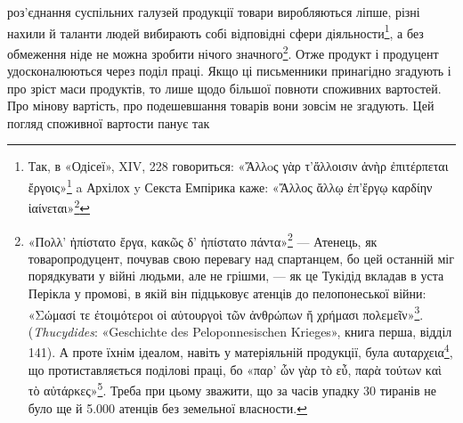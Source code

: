 роз’єднання суспільних галузей продукції товари виробляються
ліпше, різні нахили й таланти людей вибирають собі відповідні
сфери діяльности\footnote{
Так, в «Одісеї», XIV, 228 говориться: «\textgreek{Ἄλλoς γὰρ τ’ἄλλοισιν ἀνὴρ ἐπιτέρπεται ἔργοις}»\footnote*{
Одні люди люблять одне, інші — інше. \emph{Ред.}
} a Архілох y Секста Емпірика каже: «\textgreek{Ἄλλος ἄλλῳ ἐπ’ἔργῳ καρδίην ἰαίνεται}»\footnote*{
Одне тішить серце одного, інше — іншого. \emph{Ред.}
}}, а без обмеження ніде не можна зробити нічого
значного\footnote{
«\textgreek{Поλλ’ ἠπίστατο ἔργα, κακῶς δ’ ἠπίστατο πάντα}»\footnote*{
Багато знав він справ, та всі погано знав. \emph{Ред.}
} — Атенець, як товаропродуцент,
почував свою перевагу над спартанцем, бо цей останній міг
порядкувати у війні людьми, але не грішми, — як це Тукідід вкладав
в уста Перікла у промові, в якій він підцьковує атенців до пелопонеської
війни: «\textgreek{Σώμασί τε ἐτοιμότεροι οἱ αὐτουργοὶ τῶν ἀνθρώπων ἤ χρήμασι πολεμεῖν}»\footnote*{
Люди, що працюють для задоволення власних потреб, радше
віддадуть на війну свої тіла, ніж гроші. \emph{Ред.}
}. (\emph{Thucydides}:
«Geschichte des Peloponnesischen Krieges», книга перша, відділ
141). А проте їхнім ідеалом, навіть у матеріяльній продукції, була
\textgreek{αυταρχεια}\footnote*{
автаркія. \emph{Ред.}
}, що протиставляється поділові праці, бо «\textgreek{παρ’ ὧν γὰρ τὸ εὖ, παρὰ τούτων καὶ τὸ
αὐτάρκες}»\footnote*{
«з цього постає благо, а з того і незалежність». \emph{Ред.}
}. Треба при цьому зважити, що за часів упадку
30 тиранів не було ще й \num{5.000} атенців без земельної власности.
}. Отже продукт і продуцент удосконалюються через
поділ праці. Якщо ці письменники принагідно згадують і про
зріст маси продуктів, то лише щодо більшої повноти споживних
вартостей. Про мінову вартість, про подешевшання товарів вони
зовсім не згадують. Цей погляд споживної вартости панує так
